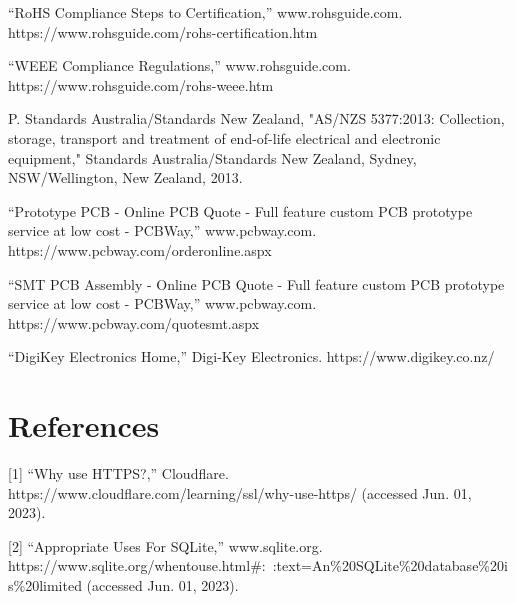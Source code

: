 “RoHS Compliance Steps to Certification,” www.rohsguide.com. https://www.rohsguide.com/rohs-certification.htm

“WEEE Compliance Regulations,” www.rohsguide.com. https://www.rohsguide.com/rohs-weee.htm

P. Standards Australia/Standards New Zealand, "AS/NZS 5377:2013: Collection, storage, transport and treatment of end-of-life electrical and electronic equipment," Standards Australia/Standards New Zealand, Sydney, NSW/Wellington, New Zealand, 2013.

“Prototype PCB - Online PCB Quote - Full feature custom PCB prototype service at low cost - PCBWay,” www.pcbway.com. https://www.pcbway.com/orderonline.aspx

“SMT PCB Assembly - Online PCB Quote - Full feature custom PCB prototype service at low cost - PCBWay,” www.pcbway.com. https://www.pcbway.com/quotesmt.aspx

“DigiKey Electronics Home,” Digi-Key Electronics. https://www.digikey.co.nz/

\section{References}

[1] “Why use HTTPS?,” Cloudflare. https://www.cloudflare.com/learning/ssl/why-use-https/ (accessed Jun. 01, 2023).

[2] “Appropriate Uses For SQLite,” www.sqlite.org. https://www.sqlite.org/whentouse.html\#:~:text=An\%20SQLite\newline\%20database\%20is\%20limited (accessed Jun. 01, 2023).